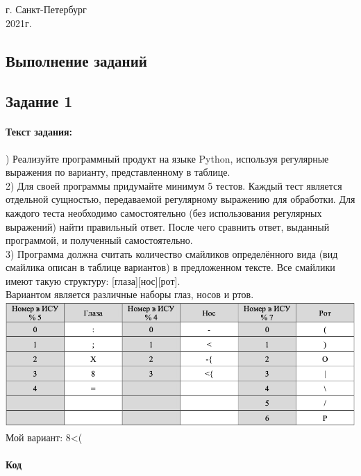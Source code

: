\documentclass[12pt,onecolumn]{article}
\begin{document}
\vspace{10cm}
\begin{center}
    г. Санкт-Петербург\\
    2021г.
\end{center}
\newpage
\tableofcontents
\newpage
\begin{flushleft}
\section{Выполнение заданий}
\subsection{Задание 1}
\paragraph{Текст задания:}
\hfill {}) Реализуйте программный продукт на языке Python, используя регулярные выражения по варианту, представленному в таблице.\\
2) Для своей программы придумайте минимум 5 тестов. Каждый тест является отдельной сущностью, передаваемой регулярному выражению для обработки. Для каждого теста необходимо самостоятельно (без использования регулярных выражений) найти правильный ответ. После чего сравнить ответ, выданный программой, и полученный самостоятельно.\\
3) Программа должна считать количество смайликов определённого вида (вид смайлика описан в таблице вариантов) в предложенном тексте. Все смайлики имеют такую структуру: [глаза][нос][рот].\\
Вариантом является различные наборы глаз, носов и ртов.\\
\includegraphics[]{images/no1.png}
\newline Мой вариант: 8<(
\paragraph{Код}
\hfill \break
\FloatBarrier
{}


\end{flushleft}
\end{document}
